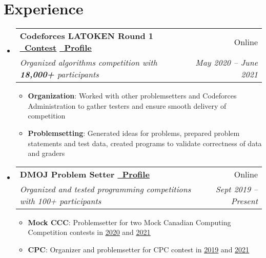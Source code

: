 \documentclass[letterpaper,11pt]{article}
\makeatletter
\newcommand{\resumeItem}[2]{
  \item\small{
    \textbf{#1}{: #2 \vspace{-2pt}}
  }
}
\newcommand{\resumeSubheading}[4]{
  \vspace{-1pt}\item
    \begin{tabular*}{0.97\textwidth}[t]{l@{\extracolsep{\fill}}r}
      \textbf{#1} & #2 \\
      \textit{\small#3} & \textit{\small #4} \\
    \end{tabular*}\vspace{-5pt}
}
\newcommand{\resumeSubHeadingListStart}{\begin{itemize}[leftmargin=*]}
\newcommand{\resumeSubHeadingListEnd}{\end{itemize}}
\newcommand{\resumeItemListStart}{\begin{itemize}}
\newcommand{\resumeItemListEnd}{\end{itemize}\vspace{-5pt}}
\newcommand{\link}[2]{\href{#1}{\color{linkblue}\underline{#2}}}
\newcommand{\linkblack}[2]{\href{#1}{\underline{#2}}}
\makeatother
\begin{document}
\section{Experience}
  \resumeSubHeadingListStart
    \resumeSubheading
      {Codeforces LATOKEN Round 1 \link{https://codeforces.com/contest/1534}{\faLink\ Contest} \link{https://codeforces.com/profile/Plasmatic}{\faLink\ Profile}}{Online}
      {Organized algorithms competition with \textbf{18,000+} participants}{May 2020 -- June 2021}
      \resumeItemListStart
        \resumeItem{Organization}
          {Worked with other problemsetters and Codeforces Administration to gather testers and ensure smooth delivery of competition}
        \resumeItem{Problemsetting}
          {Generated ideas for problems, prepared problem statements and test data, created programs to validate correctness of data and graders}
      \resumeItemListEnd
    
    \resumeSubheading
      {DMOJ Problem Setter \link{https://dmoj.ca/user/Plasmatic}{\faLink\ Profile}}{Online}
      {Organized and tested programming competitions with 100+ participants}{Sept 2019 -- Present}
      \resumeItemListStart
        \resumeItem{Mock CCC}
          {Problemsetter for two Mock Canadian Computing Competition contests in \linkblack{https://dmoj.ca/contest/mccc1}{2020} and \linkblack{https://dmoj.ca/contest/rccc1}{2021}}
        \resumeItem{CPC}
          {Organizer and problemsetter for CPC contest in \linkblack{https://dmoj.ca/contest/cpc19}{2019} and \linkblack{https://dmoj.ca/contest/cpc21c1}{2021}}
      \resumeItemListEnd
    

  \resumeSubHeadingListEnd

\end{document}
